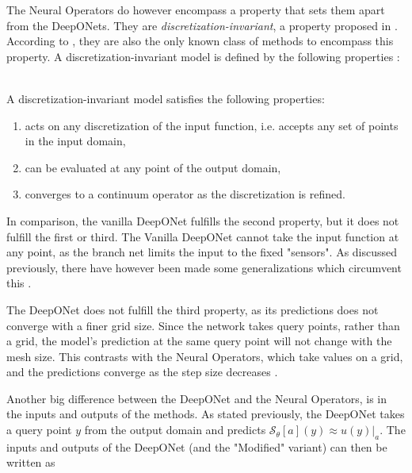 The Neural Operators do however encompass a property that sets them apart from the DeepONets. They are \textit{discretization-invariant}, a property proposed in \cite{kovachkiNeuralOperatorLearning2024}. 
According to \cite{kovachkiNeuralOperatorLearning2024}, they are also the only known class of methods to encompass this property.
A discretization-invariant model is defined by the following properties \cite{kovachkiNeuralOperatorLearning2024}:

\begin{definition}
    \hfill\\
    A discretization-invariant model satisfies the following properties:
    \begin{enumerate}
        \item acts on any discretization of the input function, i.e. accepts any set of points in the input domain,  
        \item can be evaluated at any point of the output domain,  
        \item converges to a continuum operator as the discretization is refined.
    \end{enumerate}
\end{definition}

In comparison, the vanilla DeepONet fulfills the second property, but it does not fulfill the first or third. 
The Vanilla DeepONet cannot take the input function at any point, as the branch net limits the input to the fixed "sensors".
As discussed previously, there have however been made some generalizations which circumvent this .

The DeepONet does not fulfill the third property, as its predictions does not converge with a finer grid size. Since the network takes query points, rather than a grid, the model's prediction at the same query point will not change with the mesh size.
This contrasts with the Neural Operators, which take values on a grid, and the predictions converge as the step size decreases \cite{kovachkiNeuralOperatorLearning2024}.

Another big difference between the DeepONet and the Neural Operators, is in the inputs and outputs of the methods. As stated previously, 
the DeepONet takes a query point \(y\) from the output domain and predicts \(\mathcal{S}_\theta[a](y) \approx u(y)\big|_a\). The inputs and outputs of the DeepONet (and the "Modified" variant) can then be written as

